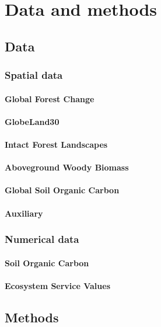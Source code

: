 \section{Data and methods}
\label{sec:datamethods}

\subsection{Data}
\label{subsec:data}

\subsubsection{Spatial data}
\paragraph{Global Forest Change}
\paragraph{GlobeLand30}
\paragraph{Intact Forest Landscapes}
\paragraph{Aboveground Woody Biomass}
\paragraph{Global Soil Organic Carbon}
\paragraph{Auxiliary}

\subsubsection{Numerical data}
\paragraph{Soil Organic Carbon}
\paragraph{Ecosystem Service Values}


\subsection{Methods}
\label{subsec:methods}

